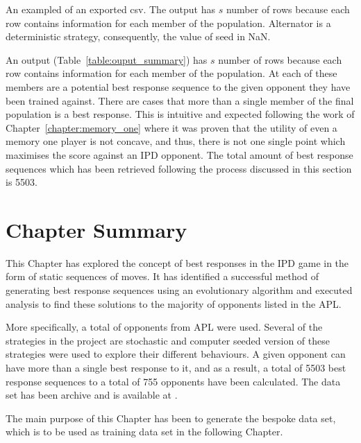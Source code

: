 \begin{table}[!htbp]
    \resizebox{\textwidth}{!}{
    }
    \caption{An exampled of an exported csv. The output has \(s\) number of rows because
    each row contains information for each member of the population. Alternator is
    a deterministic strategy, consequently,
    the value of seed in NaN.}\label{table:ouput_summary}
\end{table}

An output (Table~\ref{table:ouput_summary}) has \(s\) number of rows because
each row contains information for each member of the population. At each of these
members are a potential best response sequence to the given opponent they have
been trained against. There are cases that more than a single member of the
final population is a best response. This is intuitive and expected following the
work of Chapter~\ref{chapter:memory_one} where it was proven that the utility
of even a memory one player is not concave, and thus, there is not one single
point which maximises the score against an IPD opponent. The total amount
of best response sequences which has been retrieved following the process
discussed in this section is 5503.

\section{Chapter Summary}

This Chapter has explored the concept of best responses in the IPD game in the
form of static sequences of moves. It has identified a successful method of
generating best response sequences using an evolutionary algorithm and executed
analysis to find these solutions to the majority of opponents listed in the APL.

More specifically, a total of \numberofstrategiesbestsequences opponents from
APL were used. Several of the strategies in the project are stochastic and
computer seeded version of these strategies were used to explore their different
behaviours. A given opponent can have more than a single best response to it, and
as a result, a total of 5503 best response sequences to a total of 755 opponents
have been calculated. The data set has been archive and is available at
\cite{Glynatsi2020_sequences}.

The main purpose of this Chapter has been to generate the bespoke data set,
which is to be used as training data set in the following Chapter.
